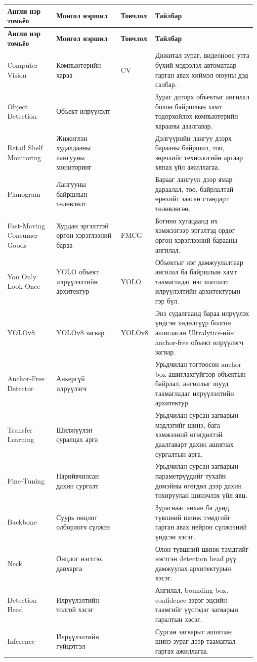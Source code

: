 
{\small
\renewcommand{\arraystretch}{1.2}
\begin{longtable}{P{0.22} P{0.20} P{0.10} P{0.40}}
\toprule
\textbf{Англи нэр томьёо} & \textbf{Монгол нэршил} & \textbf{Товчлол} & \textbf{Тайлбар} \\
\midrule
\endfirsthead
\toprule
\textbf{Англи нэр томьёо} & \textbf{Монгол нэршил} & \textbf{Товчлол} & \textbf{Тайлбар} \\
\midrule
\endhead

Computer Vision & Компьютерийн хараа & CV & Дижитал зураг, видеоноос утга бүхий мэдээлэл автоматаар гарган авах хиймэл оюуны дэд салбар. \\
Object Detection & Объект илрүүлэлт &  & Зураг доторх объектыг ангилал болон байршлын хамт тодорхойлох компьютерийн харааны даалгавар. \\
Retail Shelf Monitoring & Жижиглэн худалдааны лангууны мониторинг &  & Дэлгүүрийн лангуу дээрх барааны байршил, тоо, зөрчлийг технологийн аргаар хянах үйл ажиллагаа. \\
Planogram & Лангууны байршлын төлөвлөлт &  & Барааг лангуун дээр ямар дараалал, тоо, байрлалтай өрөхийг заасан стандарт төлөвлөгөө. \\
Fast-Moving Consumer Goods & Хурдан эргэлттэй өргөн хэрэглээний бараа & FMCG & Богино хугацаанд их хэмжээгээр эргэлтэд ордог өргөн хэрэглээний барааны ангилал. \\
\midrule

You Only Look Once & YOLO объект илрүүлэлтийн архитектур & YOLO & Объектыг нэг дамжуулалтаар ангилал ба байршлын хамт таамагладаг нэг шатлалт илрүүлэлтийн архитектурын гэр бүл. \\
YOLOv8 & YOLOv8 загвар & YOLOv8 & Энэ судалгаанд бараа илрүүлэх үндсэн хөдөлгүүр болгон ашигласан Ultralytics-ийн anchor-free объект илрүүлэгч загвар. \\
Anchor-Free Detector & Анкергүй илрүүлэгч &  & Урьдчилан тогтоосон anchor box ашиглахгүйгээр объектын байрлал, ангиллыг шууд таамагладаг илрүүлэлтийн архитектур. \\
Transfer Learning & Шилжүүлэн суралцах арга &  & Урьдчилан сурсан загварын мэдлэгийг шинэ, бага хэмжээний өгөгдөлтэй даалгаварт дахин ашиглах сургалтын арга. \\
Fine-Tuning & Нарийвчилсан дахин сургалт &  & Урьдчилан сурсан загварын параметрүүдийг тухайн домэйны өгөгдөл дээр дахин тохируулан шинэчлэх үйл явц. \\
Backbone & Суурь онцлог олборлогч сүлжээ &  & Зурагнаас анхан ба дунд түвшний шинж тэмдгийг гарган авах нейрон сүлжээний үндсэн хэсэг. \\
Neck & Онцлог нэгтгэх давхарга &  & Олон түвшний шинж тэмдгийг нэгтгэн detection head рүү дамжуулах архитектурын хэсэг. \\
Detection Head & Илрүүлэлтийн толгой хэсэг &  & Ангилал, bounding box, confidence зэрэг эцсийн таамгийг үүсгэдэг загварын гаралтын хэсэг. \\
Inference & Илрүүлэлтийн гүйцэтгэл &  & Сурсан загварыг ашиглан шинэ зураг дээр таамаглал гаргах ажиллагаа. \\
\midrule


\end{longtable}}
